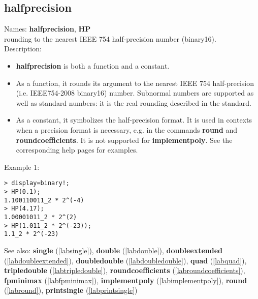 \subsection{halfprecision}
\label{labhalfprecision}
\noindent Names: \textbf{halfprecision}, \textbf{HP}\\
rounding to the nearest IEEE 754 half-precision number (binary16).\\
\noindent Description: \begin{itemize}

\item \textbf{halfprecision} is both a function and a constant.

\item As a function, it rounds its argument to the nearest IEEE 754 half-precision (i.e. IEEE754-2008 binary16) number.
   Subnormal numbers are supported as well as standard numbers: it is the real
   rounding described in the standard.

\item As a constant, it symbolizes the half-precision format. It is used in 
   contexts when a precision format is necessary, e.g. in the commands 
   \textbf{round} and \textbf{roundcoefficients}. It is not supported for \textbf{implementpoly}.
   See the corresponding help pages for examples.
\end{itemize}
\noindent Example 1: 
\begin{center}\begin{minipage}{15cm}\begin{Verbatim}[frame=single]
> display=binary!;
> HP(0.1);
1.100110011_2 * 2^(-4)
> HP(4.17);
1.00001011_2 * 2^(2)
> HP(1.011_2 * 2^(-23));
1.1_2 * 2^(-23)
\end{Verbatim}
\end{minipage}\end{center}
See also: \textbf{single} (\ref{labsingle}), \textbf{double} (\ref{labdouble}), \textbf{doubleextended} (\ref{labdoubleextended}), \textbf{doubledouble} (\ref{labdoubledouble}), \textbf{quad} (\ref{labquad}), \textbf{tripledouble} (\ref{labtripledouble}), \textbf{roundcoefficients} (\ref{labroundcoefficients}), \textbf{fpminimax} (\ref{labfpminimax}), \textbf{implementpoly} (\ref{labimplementpoly}), \textbf{round} (\ref{labround}), \textbf{printsingle} (\ref{labprintsingle})

